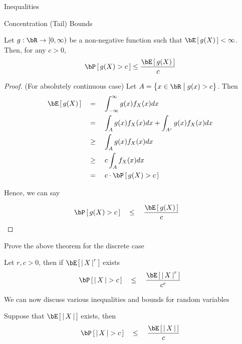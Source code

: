\documentclass{article}
\begin{document}
\begin{ssection}{Inequalities}
\begin{ssubsection}{Concentration (Tail) Bounds}
		\begin{theorem}
			Let $g : \bR \ra [0, \infty)$ be a non-negative function such that $\E{g(X)} < \infty$. Then, for any $c > 0$,
			\begin{align*}
				\prob{g(X) > c}	\le	\frac{\E{g(X)}}{c}
			\end{align*}
		\end{theorem}

		\begin{proof} (For absolutely continuous case)
			Let $A = \set{x \in \bR \pipe g(x) > c}$. Then
			\begin{align*}
				\E{g(X)}	&\eq	\int_{-\infty}^\infty g(x) f_X(x) dx \\
							&\eq	\int_A g(x) f_X(x) dx + \int_{A^c} g(x) f_X(x) dx \\
							&\qge	\int_A g(x) f_X(x) dx \\
							&\qge	c \int_A f_X(x) dx \\
							&\eq	c \cdot \prob{g(X) > c}
			\end{align*}

			Hence, we can say

			\begin{align*}
				\prob{g(X) > c}	&\qle	\frac{\E{g(X)}}{c}
			\end{align*}
		\end{proof}

		\begin{exercise}
			Prove the above theorem for the discrete case
		\end{exercise}

		\begin{corollary}
		Let $r, c > 0$, then if $\E{\abs{X}^r}$ exists
			\begin{align*}
				\prob{\abs{X} > c}	\qle	\frac{\E{\abs{X}^r}}{c^r}
			\end{align*}
		\end{corollary}

		We can now discuss various inequalities and bounds for random variables

		\begin{enumerate}[label=\bt{\theenumi.}]

				Suppose that $\E{\abs{X}}$ exists, then
					\begin{align*}
						\prob{\abs{X} > c}	\qle	\frac{\E{\abs{X}}}{c}
					\end{align*}



\end{enumerate}
\end{ssubsection}
\end{ssection}
\end{document}
